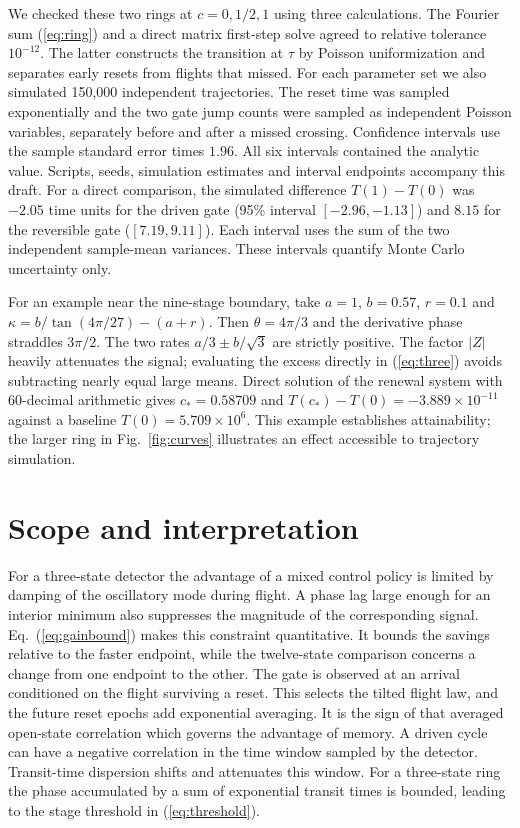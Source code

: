 \documentclass[11pt]{article}
\begin{document}
We checked these two rings at $c=0,1/2,1$ using three calculations. The Fourier sum (\ref{eq:ring}) and a direct matrix first-step solve agreed to relative tolerance $10^{-12}$. The latter constructs the transition at $\tau$ by Poisson uniformization and separates early resets from flights that missed. For each parameter set we also simulated 150,000 independent trajectories. The reset time was sampled exponentially and the two gate jump counts were sampled as independent Poisson variables, separately before and after a missed crossing. Confidence intervals use the sample standard error times $1.96$. All six intervals contained the analytic value. Scripts, seeds, simulation estimates and interval endpoints accompany this draft. For a direct comparison, the simulated difference $T(1)-T(0)$ was $-2.05$ time units for the driven gate (95\% interval $[-2.96,-1.13]$) and $8.15$ for the reversible gate ($[7.19,9.11]$). Each interval uses the sum of the two independent sample-mean variances. These intervals quantify Monte Carlo uncertainty only.

For an example near the nine-stage boundary, take $a=1$, $b=0.57$, $r=0.1$ and $\kappa=b/\tan(4\pi/27)-(a+r)$. Then $\theta=4\pi/3$ and the derivative phase straddles $3\pi/2$. The two rates $a/3\pm b/\sqrt3$ are strictly positive. The factor $|Z|$ heavily attenuates the signal; evaluating the excess directly in (\ref{eq:three}) avoids subtracting nearly equal large means. Direct solution of the renewal system with 60-decimal arithmetic gives $c_*=0.58709$ and $T(c_*)-T(0)=-3.889\times10^{-11}$ against a baseline $T(0)=5.709\times10^6$. This example establishes attainability; the larger ring in Fig.~\ref{fig:curves} illustrates an effect accessible to trajectory simulation.



\section{Scope and interpretation}
For a three-state detector the advantage of a mixed control policy is limited by damping of the oscillatory mode during flight. A phase lag large enough for an interior minimum also suppresses the magnitude of the corresponding signal. Eq.~(\ref{eq:gainbound}) makes this constraint quantitative. It bounds the savings relative to the faster endpoint, while the twelve-state comparison concerns a change from one endpoint to the other. The gate is observed at an arrival conditioned on the flight surviving a reset. This selects the tilted flight law, and the future reset epochs add exponential averaging. It is the sign of that averaged open-state correlation which governs the advantage of memory. A driven cycle can have a negative correlation in the time window sampled by the detector. Transit-time dispersion shifts and attenuates this window. For a three-state ring the phase accumulated by a sum of exponential transit times is bounded, leading to the stage threshold in (\ref{eq:threshold}).
\end{document}
